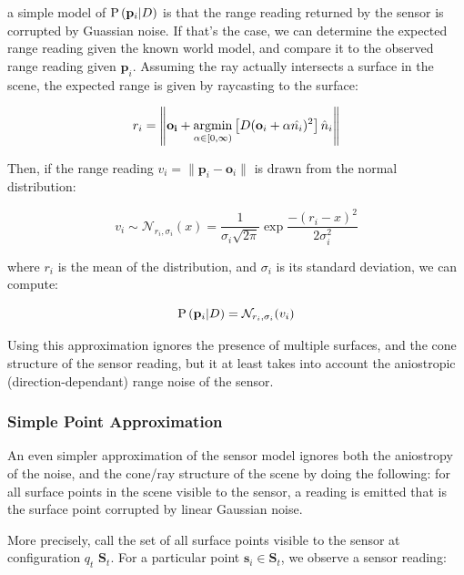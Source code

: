 \documentclass{article}
\begin{document}
\noindent a simple model of $\text{P} \left(\mathbf{p}_i | D \right)$ is that the range reading returned by the sensor is corrupted by Guassian noise. If that's the case, we can determine the expected range reading given the known world model, and
compare it to the observed range reading given $\mathbf{p}_i$. Assuming the ray actually intersects a surface in the scene, the expected range is given by raycasting to the surface:

\begin{equation}
r_i = \left\|\mathbf{o_i} +  \argmin_{\alpha \in [0, \infty)} \left[D(\mathbf{o}_i + \alpha \hat{n_i})^2\right] \hat{n}_i\right\|
\end{equation}


Then, if the range reading $v_i =\| \mathbf{p}_i - \mathbf{o}_i\| $ is drawn from the normal distribution:

\begin{equation}
v_i \sim \mathcal{N}_{r_i, \sigma_i}(x)= \frac{1}{\sigma_i \sqrt{2 \pi}} \exp{\frac{-(r_i - x)^2}{2 \sigma_i^2}}
\end{equation}

\noindent where $r_i$ is the mean of the distribution, and $\sigma_i$ is its standard deviation, we can compute:

\begin{equation}
\text{P} \left(\mathbf{p}_i | D \right) = \mathcal{N}_{r_i, \sigma_i}(v_i)
\end{equation} 

Using this approximation ignores the presence of multiple surfaces, and the cone structure of the sensor reading,  but it at least takes into account the aniostropic (direction-dependant) range noise of the sensor.

\subsubsection{Simple Point Approximation}

An even simpler approximation of the sensor model ignores both the aniostropy of the noise, and the cone/ray structure of the scene by doing the following: for all surface points in the scene visible to the sensor, a reading is emitted that is the
surface point corrupted by linear Gaussian noise.

More precisely, call the set of all surface points visible to the sensor at configuration $q_t$ $\mathbf{S}_t$.  For a particular point $\mathbf{s}_i \in \mathbf{S}_t$, we observe a sensor reading:
\end{document}
